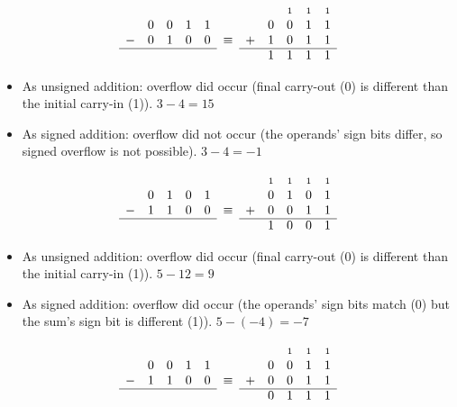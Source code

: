 \documentclass{article}
\newcommand{\carry}{\scriptstyle 1}
\begin{document}
\begin{equation*}\begin{array}{ccccccccccc}
  &   &   &   &   &        &   &   & \carry & \carry & \carry \\
  & 0 & 0 & 1 & 1 &        &   & 0 & 0 & 1 & 1 \\
- & 0 & 1 & 0 & 0 & \equiv & + & 1 & 0 & 1 & 1 \\ \cline{1-5}\cline{7-11}
  &   &   &   &   &        &   & 1 & 1 & 1 & 1
\end{array}\end{equation*}

\begin{itemize}
\item As unsigned addition: overflow did occur (final carry-out (0) is
    different than the initial carry-in (1)). $3-4=15$
\item As signed addition: overflow did not occur (the operands' sign bits
    differ, so signed overflow is not possible). $3-4=-1$
\end{itemize}

\begin{equation*}\begin{array}{ccccccccccc}
  &   &   &   &   &        &   & \carry & \carry & \carry & \carry \\
  & 0 & 1 & 0 & 1 &        &   & 0 & 1 & 0 & 1 \\
- & 1 & 1 & 0 & 0 & \equiv & + & 0 & 0 & 1 & 1 \\ \cline{1-5}\cline{7-11}
  &   &   &   &   &        &   & 1 & 0 & 0 & 1
\end{array}\end{equation*}

\begin{itemize}
\item As unsigned addition: overflow did occur (final carry-out (0) is
    different than the initial carry-in (1)). $5-12=9$
\item As signed addition: overflow did occur (the operands' sign bits match (0)
    but the sum's sign bit is different (1)). $5-(-4)=-7$
\end{itemize}

\begin{equation*}\begin{array}{ccccccccccc}
  &   &   &   &   &        &   &   & \carry & \carry & \carry \\
  & 0 & 0 & 1 & 1 &        &   & 0 & 0 & 1 & 1 \\
- & 1 & 1 & 0 & 0 & \equiv & + & 0 & 0 & 1 & 1 \\ \cline{1-5}\cline{7-11}
  &   &   &   &   &        &   & 0 & 1 & 1 & 1
\end{array}\end{equation*}
\end{document}
